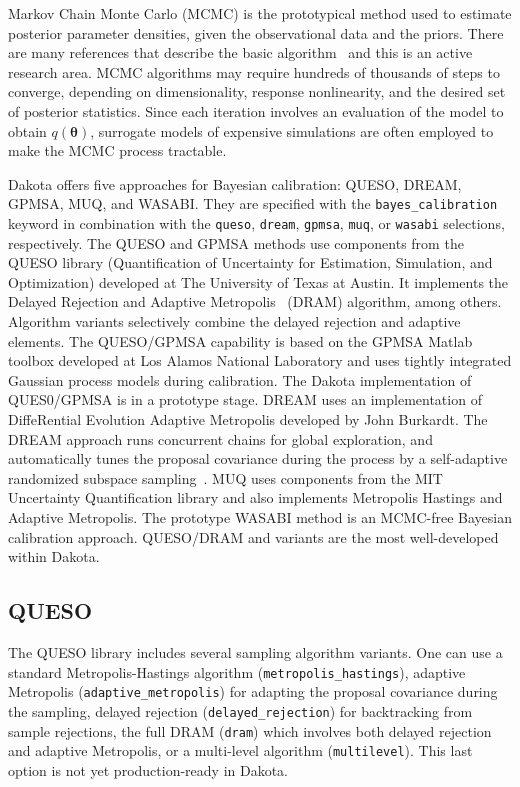 Markov Chain Monte Carlo (MCMC) is the prototypical method used to
estimate posterior parameter densities, given the observational data
and the priors. There are many references that describe the basic
algorithm~\cite{Gilks} and this is an active research area.  MCMC
algorithms may require hundreds of thousands of steps to converge,
depending on dimensionality, response nonlinearity, and the desired
set of posterior statistics.  Since each iteration involves an
evaluation of the model to obtain $q(\boldsymbol{\theta})$, surrogate
models of expensive simulations are often employed to make the MCMC
process tractable.
 
Dakota offers five approaches for Bayesian calibration: QUESO, DREAM,
GPMSA, MUQ, and WASABI.  They are specified with the
\texttt{bayes\_calibration} keyword in combination with the
\texttt{queso}, \texttt{dream}, \texttt{gpmsa}, \texttt{muq}, or \texttt{wasabi}
selections, respectively.  The QUESO and GPMSA methods use components
from the QUESO library (Quantification of Uncertainty for Estimation,
Simulation, and Optimization) developed at The University of Texas at
Austin.  It implements the Delayed Rejection and Adaptive
Metropolis~\cite{Haario} (DRAM) algorithm, among others.  Algorithm
variants selectively combine the delayed rejection and adaptive
elements.  The QUESO/GPMSA capability is based on the GPMSA Matlab
toolbox developed at Los Alamos National Laboratory and uses tightly
integrated Gaussian process models during calibration.  The Dakota
implementation of QUES0/GPMSA is in a prototype stage.  DREAM uses an
implementation of DiffeRential Evolution Adaptive Metropolis developed
by John Burkardt.  The DREAM approach runs concurrent chains for
global exploration, and automatically tunes the proposal covariance
during the process by a self-adaptive randomized subspace
sampling~\cite{Vrugt}.  MUQ uses components from the MIT 
Uncertainty Quantification library and also implements Metropolis Hastings 
and Adaptive Metropolis. The prototype WASABI method is an MCMC-free
Bayesian calibration approach.  QUESO/DRAM
and variants are the most well-developed within Dakota.

\subsection{QUESO}\label{uq:bayesian:queso}
The QUESO library includes several sampling algorithm variants.  One
can use a standard Metropolis-Hastings algorithm
(\texttt{metropolis\_hastings}), adaptive Metropolis
(\texttt{adaptive\_metropolis}) for adapting the proposal covariance
during the sampling, delayed rejection (\texttt{delayed\_rejection})
for backtracking from sample rejections, the full DRAM (\texttt{dram})
which involves both delayed rejection and adaptive Metropolis, or a
multi-level algorithm (\texttt{multilevel}).  This last option is not
yet production-ready in Dakota. 

